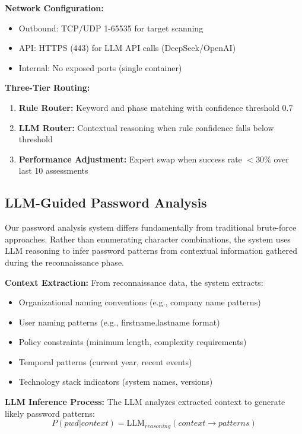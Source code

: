 \documentclass[preprint,12pt]{elsarticle}
\begin{document}
\textbf{Network Configuration:}
\begin{itemize}
    \item Outbound: TCP/UDP 1-65535 for target scanning
    \item API: HTTPS (443) for LLM API calls (DeepSeek/OpenAI)
    \item Internal: No exposed ports (single container)
\end{itemize}

\textbf{Three-Tier Routing:}
\begin{enumerate}
    \item \textbf{Rule Router:} Keyword and phase matching with confidence threshold 0.7
    \item \textbf{LLM Router:} Contextual reasoning when rule confidence falls below threshold
    \item \textbf{Performance Adjustment:} Expert swap when success rate $< 30\%$ over last 10 assessments
\end{enumerate}

\subsection{LLM-Guided Password Analysis}

Our password analysis system differs fundamentally from traditional brute-force approaches. Rather than enumerating character combinations, the system uses LLM reasoning to infer password patterns from contextual information gathered during the reconnaissance phase.

\textbf{Context Extraction:} From reconnaissance data, the system extracts:
\begin{itemize}
    \item Organizational naming conventions (e.g., company name patterns)
    \item User naming patterns (e.g., firstname.lastname format)
    \item Policy constraints (minimum length, complexity requirements)
    \item Temporal patterns (current year, recent events)
    \item Technology stack indicators (system names, versions)
\end{itemize}

\textbf{LLM Inference Process:} The LLM analyzes extracted context to generate likely password patterns:
\begin{equation}
P(pwd | context) = \text{LLM}_{reasoning}(context \rightarrow patterns)
\end{equation}
\end{document}
